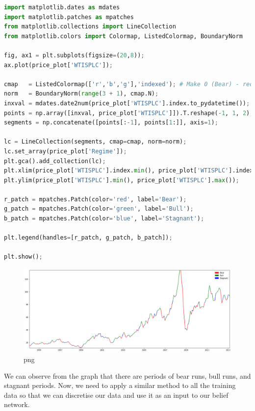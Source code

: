 \begin{lstlisting}[language=Python]
import matplotlib.dates as mdates
import matplotlib.patches as mpatches
from matplotlib.collections import LineCollection
from matplotlib.colors import Colormap, ListedColormap, BoundaryNorm

fig, ax1 = plt.subplots(figsize=(20,8));
ax.plot(price_plot['WTISPLC']);

cmap   = ListedColormap(['r','b','g'],'indexed'); # Make 0 (Bear) - red, 1 (Stagnant) - blue, 2 (Bull) - green 
norm   = BoundaryNorm(range(3 + 1), cmap.N);
inxval = mdates.date2num(price_plot['WTISPLC'].index.to_pydatetime());
points = np.array([inxval, price_plot['WTISPLC']]).T.reshape(-1, 1, 2);
segments = np.concatenate([points[:-1], points[1:]], axis=1);

lc = LineCollection(segments, cmap=cmap, norm=norm);
lc.set_array(price_plot['Regime']);
plt.gca().add_collection(lc);
plt.xlim(price_plot['WTISPLC'].index.min(), price_plot['WTISPLC'].index.max());
plt.ylim(price_plot['WTISPLC'].min(), price_plot['WTISPLC'].max());

r_patch = mpatches.Patch(color='red', label='Bear');
g_patch = mpatches.Patch(color='green', label='Bull');
b_patch = mpatches.Patch(color='blue', label='Stagnant');

plt.legend(handles=[r_patch, g_patch, b_patch]);

plt.show();
\end{lstlisting}

\begin{figure}
\centering
\includegraphics{Implementation_files/Implementation_49_0.png}
\caption{png}
\end{figure}

We can observe from the graph that there are periods of bear runs, bull
runs, and stagnant periods. Now, we need to apply a similar method to
all the training data so that we can discretise our data and use it as
an input to our belief network.

